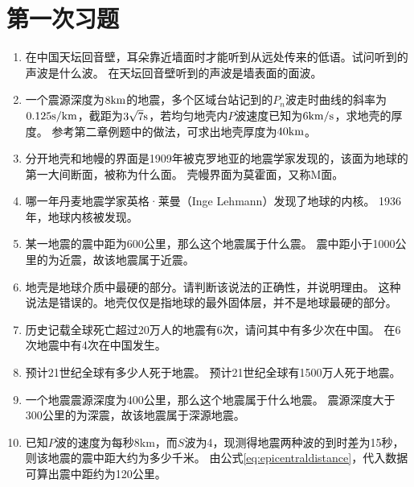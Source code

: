 \documentclass[twoside,titlepage,hyperref,UTF8,12pt]{ctexart}
\begin{document}
\section{第一次习题}
\begin{enumerate}
    \item 在中国天坛回音壁，耳朵靠近墙面时才能听到从远处传来的低语。试问听到的声波是什么波。\newline
    {\kaishu{}在天坛回音壁听到的声波是墙表面的面波。}
    \item 一个震源深度为$8\rm{km}$的地震，多个区域台站记到的$P_n$波走时曲线的斜率为$0.125\rm{s/km}$，截距为$3\sqrt{7}\rm{s}$，若均匀地壳内$P$波速度已知为$6\rm{km/s}$，求地壳的厚度。\newline
    {\kaishu{}参考第二章例题中的做法，可求出地壳厚度为$40\rm{km}$。}
    \item 分开地壳和地幔的界面是1909年被克罗地亚的地震学家发现的，该面为地球的第一大间断面，被称为什么面。\newline
    {\kaishu{}壳幔界面为莫霍面，又称M面。}
    \item 哪一年丹麦地震学家英格·莱曼（Inge Lehmann）发现了地球的内核。\newline
    {\kaishu{}1936年，地球内核被发现。}
    \item 某一地震的震中距为600公里，那么这个地震属于什么震。\newline
    {\kaishu{}震中距小于1000公里的为近震，故该地震属于近震。}
    \item 地壳是地球介质中最硬的部分。请判断该说法的正确性，并说明理由。\newline
    {\kaishu{}这种说法是错误的。地壳仅仅是指地球的最外固体层，并不是地球最硬的部分。}
    \item 历史记载全球死亡超过20万人的地震有6次，请问其中有多少次在中国。\newline
    {\kaishu{}在6次地震中有4次在中国发生。}
    \item 预计21世纪全球有多少人死于地震。\newline
    {\kaishu{}预计21世纪全球有1500万人死于地震。}
    \item 一个地震震源深度为400公里，那么这个地震属于什么地震。\newline
    {\kaishu{}震源深度大于300公里的为深震，故该地震属于深源地震。}
    \item 已知$P$波的速度为每秒8km，而$S$波为4，现测得地震两种波的到时差为15秒，则该地震的震中距大约为多少千米。\newline
    {\kaishu{}由公式\ref{eq:epicentraldistance}，代入数据可算出震中距约为120公里。}
\end{enumerate}
\end{document}
